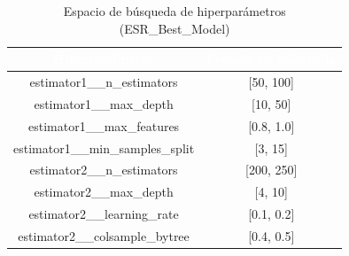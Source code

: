 \begin{table}[htp]
	\centering
	\renewcommand{\arraystretch}{1.3}
		\begin{tabular}{ | c | c | }
			\hline
			\rowcolor[HTML]{5B9BD5} 
			\textcolor{white}{\textbf{Hiperparámetro}} & \textcolor{white}{\textbf{Espacio de búsqueda}}\\
			\hline
			
			estimator1\_\_n\_estimators & [50, 100] \\
			\hline
			estimator1\_\_max\_depth & [10, 50] \\
			\hline
			estimator1\_\_max\_features & [0.8, 1.0] \\
			\hline
			estimator1\_\_min\_samples\_split & [3, 15] \\
			\hline
			estimator2\_\_n\_estimators & [200, 250] \\
			\hline
			estimator2\_\_max\_depth & [4, 10] \\
			\hline
			estimator2\_\_learning\_rate & [0.1, 0.2] \\
			\hline
			estimator2\_\_colsample\_bytree & [0.4, 0.5] \\
			\hline
			
		\end{tabular} 
		
		\caption{Espacio de búsqueda de hiperparámetros (ESR\_Best\_Model)}
	\end{table}